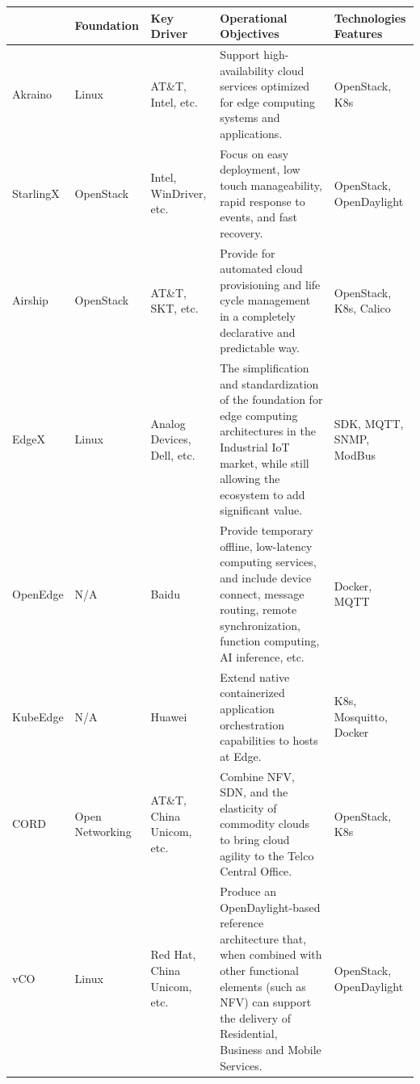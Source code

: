\begin{turn}{90}
    \begin{tabular}{ | p{2cm} | p{2cm} | p{3cm} | p{8cm} | p{2.5cm} | }
    \hline
      & Foundation & Key Driver & Operational Objectives & Technologies Features\\ \hline
    Akraino & Linux & AT\&T, Intel, etc. & Support high-availability cloud services optimized for edge computing systems and applications. & OpenStack, K8s \\ \hline

    StarlingX & OpenStack & Intel, WinDriver, etc. & Focus on easy deployment, low touch manageability, rapid response to events, and fast recovery. & OpenStack, OpenDaylight \\ \hline

    Airship & OpenStack &  AT\&T, SKT, etc. & Provide for automated cloud provisioning and life cycle management in a completely declarative and predictable way. & OpenStack, K8s, Calico \\ \hline

    EdgeX & Linux & Analog Devices, Dell, etc. & The simplification and standardization of the foundation for edge computing architectures in the Industrial IoT market, while still allowing the ecosystem to add significant value. & SDK, MQTT, SNMP, ModBus \\ \hline

    OpenEdge & N/A & Baidu & Provide temporary offline, low-latency computing services, and include device connect, message routing, remote synchronization, function computing, AI inference, etc. & Docker, MQTT \\ \hline

    KubeEdge & N/A & Huawei & Extend native containerized application orchestration capabilities to hosts at Edge. & K8s, Mosquitto, Docker \\ \hline

    CORD & Open Networking & AT\&T, China Unicom, etc. & Combine NFV, SDN, and the elasticity of commodity clouds to bring cloud agility to the Telco Central Office. & OpenStack, K8s \\ \hline

    vCO & Linux & Red Hat, China Unicom, etc. &  Produce an OpenDaylight-based reference architecture that, when combined with other
    functional elements (such as NFV) can support the delivery of Residential, Business and Mobile Services. & OpenStack, OpenDaylight \\ \hline
    
    \end{tabular}
\end{turn}
